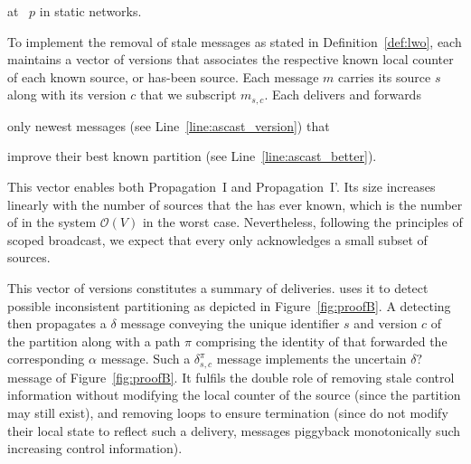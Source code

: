 \begin{algorithm}
  
  \caption{\label{algo:ascast}\NAME at \Process~$p$ in static networks.}
\end{algorithm}

To implement the removal of stale messages as stated in
Definition~\ref{def:lwo}, each \process maintains a vector of versions
that associates the respective known local counter of each known
source, or has-been source. Each message $m$ carries its source $s$
along with its version $c$ that we subscript $m_{s, c}$.  Each
\process delivers and forwards
\begin{inparaenum}[(i)]
\item only newest messages (see Line~\ref{line:ascast_version}) that
\item improve their best known partition (see
  Line~\ref{line:ascast_better}).
\end{inparaenum}
This vector enables both Propagation~I and Propagation~I'.  Its size
increases linearly with the number of sources that the \process has
ever known, which is the number of \processes in the system
$\mathcal{O}(V)$ in the worst case.
Nevertheless, following the principles of scoped broadcast, we expect
that every \process only acknowledges a small subset of sources.

This vector of versions constitutes a summary of deliveries. \NAME
uses it to detect possible inconsistent partitioning as depicted in
Figure~\ref{fig:proofB}. A detecting \process then propagates a
$\delta$ message conveying the unique identifier $s$ and version $c$
of the partition along with a path $\pi$ comprising the identity of
\processes that forwarded the corresponding $\alpha$ message. Such a
$\delta_{s, c}^{\pi}$ message implements the uncertain $\delta?$
message of Figure~\ref{fig:proofB}. It fulfils the double role of
removing stale control information without modifying the local counter
of the source (since the partition may still exist), and removing
loops to ensure termination (since \processes do not modify their
local state to reflect such a delivery, messages piggyback
monotonically such increasing control information).

